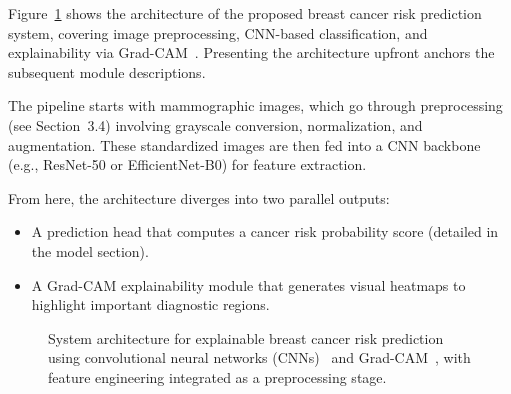 \documentclass[12pt]{article}
\begin{document}
Figure~\ref{fig:system_architecture} shows the architecture of the proposed breast cancer risk prediction system, covering image preprocessing, CNN-based classification, and explainability via Grad-CAM~\cite{1,5}. Presenting the architecture upfront anchors the subsequent module descriptions.

The pipeline starts with mammographic images, which go through preprocessing (see Section~3.4) involving grayscale conversion, normalization, and augmentation. These standardized images are then fed into a CNN backbone (e.g., ResNet-50 or EfficientNet-B0) for feature extraction.


From here, the architecture diverges into two parallel outputs:
\begin{itemize}
    \item A prediction head that computes a cancer risk probability score (detailed in the model section).
    \item A Grad-CAM explainability module that generates visual heatmaps to highlight important diagnostic regions.
\end{itemize}

\begin{figure}[H]
    \centering
    \caption{System architecture for explainable breast cancer risk prediction using convolutional neural networks (CNNs)~\cite{1} and Grad-CAM~\cite{5}, with feature engineering integrated as a preprocessing stage.}
    \label{fig:system_architecture}
\end{figure}
\end{document}
